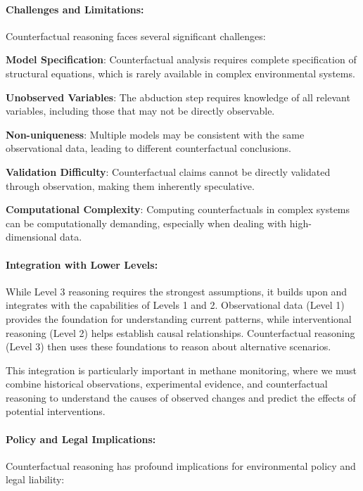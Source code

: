\paragraph{Challenges and Limitations:}

Counterfactual reasoning faces several significant challenges:

\textbf{Model Specification}: Counterfactual analysis requires complete specification of structural equations, which is rarely available in complex environmental systems.

\textbf{Unobserved Variables}: The abduction step requires knowledge of all relevant variables, including those that may not be directly observable.

\textbf{Non-uniqueness}: Multiple models may be consistent with the same observational data, leading to different counterfactual conclusions.

\textbf{Validation Difficulty}: Counterfactual claims cannot be directly validated through observation, making them inherently speculative.

\textbf{Computational Complexity}: Computing counterfactuals in complex systems can be computationally demanding, especially when dealing with high-dimensional data.

\paragraph{Integration with Lower Levels:}

While Level 3 reasoning requires the strongest assumptions, it builds upon and integrates with the capabilities of Levels 1 and 2. Observational data (Level 1) provides the foundation for understanding current patterns, while interventional reasoning (Level 2) helps establish causal relationships. Counterfactual reasoning (Level 3) then uses these foundations to reason about alternative scenarios.

This integration is particularly important in methane monitoring, where we must combine historical observations, experimental evidence, and counterfactual reasoning to understand the causes of observed changes and predict the effects of potential interventions.

\paragraph{Policy and Legal Implications:}

Counterfactual reasoning has profound implications for environmental policy and legal liability:

